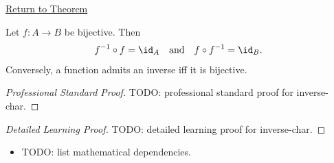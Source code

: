 \newpage
{}
\label{prf:inverse-char}

\begin{remark*}[Return]
\hyperref[thm:inverse-char]{Return to Theorem}
\end{remark*}

\begin{theorem*}
Let $f : A \to B$ be bijective. Then
\[
f^{-1} \circ f = \id_A
\quad\text{and}\quad
f \circ f^{-1} = \id_B.
\]
Conversely, a function admits an inverse iff it is bijective.
\end{theorem*}

\begin{proof}[Professional Standard Proof]
\LRAProofBodyStart
TODO: professional standard proof for inverse-char.
\end{proof}

\begin{proof}[Detailed Learning Proof]
\LRAProofBodyStart
TODO: detailed learning proof for inverse-char.
\end{proof}

\begin{remark*}
\end{remark*}

\begin{dependencies}
\begin{itemize}
  \item TODO: list mathematical dependencies.
\end{itemize}
\end{dependencies}

\clearpage
